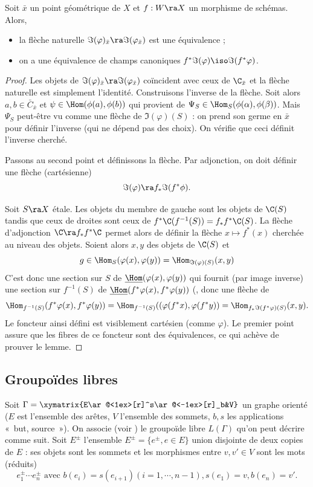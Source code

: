 \documentclass[10pt]{../fichiers-configuration-latex/smfart}
\begin{document}
\begin{lemme2}\label{20-lemme-im} Soit $\bar x$ un point géométrique de $X$ et $f:W\ra X$ un
morphisme de schémas. Alors, \begin{itemize} \item la flèche naturelle $\Im(\varphi)_{\bar
x}\ra\Im(\varphi_{\bar x})$ est une équivalence ; \item on a une équivalence de champs canoniques
$f^*\Im(\varphi)\iso\Im(f^*\varphi)$.  \end{itemize} \end{lemme2}

\begin{proof} Les objets de $\Im(\varphi)_{\bar x}\ra\Im(\varphi_{\bar x})$ coïncident avec ceux de
$\C_{\bar x}$ et la flèche naturelle est simplement l'identité. Construisons l'inverse de la flèche.
Soit alors $a,b\in\bar C_{\bar x}$ et $\psi\in\Hom(\phi(a),\phi(b))$ qui provient de
$\Psi_S\in\Hom_S(\phi(\alpha),\phi(\beta))$. Mais $\Psi_S$ peut-être vu comme une flèche de
$\Im(\varphi)(S)$ : on prend son germe en $\bar x$ pour définir l'inverse (qui ne dépend pas des
choix). On vérifie que ceci définit l'inverse cherché.

Passons au second point et définissons la flèche. Par adjonction, on doit définir une flèche
(cartésienne) $$\Im(\varphi)\ra f_*\Im(f^*\phi).$$


Soit $S\ra X$ étale. Les objets du membre de gauche sont les objets de $\C(S)$ tandis que ceux de
droites sont ceux de $f^*\C(f^{-1}(S))=f_*f^*\C(S)$. La flèche d'adjonction $\C\ra f_*f^*\C$ permet
alors de définir  la flèche $x\mapsto f^*(x)$ cherchée au niveau des objets. Soient alors $x,y$ des
objets de $\C(S)$ et $$g\in\Hom_S(\varphi(x),\varphi(y))=\Hom_{\Im(\varphi)(S)}(x,y)$$ C'est donc
une section sur $S$ de $\underline{\Hom}(\varphi(x),\varphi(y))$ qui fournit (par image
inverse) une section sur $f^{-1}(S)$ de $\underline{\Hom}(f^*\varphi(x),f^*\varphi(y))$
(\cite[II.3.2.8.1 (4)]{CNA@Giraud}, donc une flèche de
$$\Hom_{f^{-1}(S)}(f^*\varphi(x),f^*\varphi(y))=\Hom_{f^{-1}(S)}((\varphi(f^*x),\varphi(f^*y))=
\Hom_{f_*\Im(f^*\varphi)(S)}(x,y).$$ Le foncteur ainsi défini est visiblement cartésien (comme
$\varphi$).  Le premier point assure que les fibres de ce foncteur sont des équivalences, ce qui
achève de prouver le lemme.\end{proof}

\subsection{Groupoïdes libres}Soit $\Gamma=\xymatrix{E\ar@<1ex>[r]^s\ar@<-1ex>[r]_b&V}$ un graphe
orienté ($E$ est l'ensemble des arêtes, $V$ l'ensemble des sommets, $b,s$ les applications « but,
source »). On associe (voir \cite{Ber95}) le groupoïde libre $L(\Gamma)$ qu'on peut décrire comme
suit. Soit $E^{\pm}$ l'ensemble $E^\pm=\{e^{\pm},e\in E\}$ union disjointe de deux copies de $E$ :
ses objets sont les sommets et les morphismes entre $v,v'\in V$ sont les mots (réduits)
$$e_1^{\pm}\cdots e_n^{\pm} \text{ avec } b(e_i)=s(e_{i+1}) (i=1,\cdots, n-1),  s(e_1)=v,
b(e_n)=v'.$$
\end{document}
